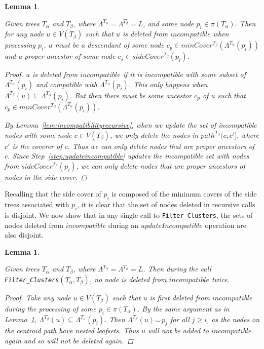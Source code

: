 \documentclass{article}
\newcommand{\compatible}{\smile}
\newcommand{\leafset}{\Lambda}
\newcommand{\TA}{T_\alpha}
\newcommand{\TB}{T_\beta}
\newtheorem{numremovednodesrecursive}[incompatibility]{Lemma}
\newtheorem{numremovednodescentroid}[incompatibility]{Lemma}
\begin{document}
    \begin{numremovednodesrecursive}
        \label{lem:numremovednodesrecursive}

        Given trees $\TA$ and $\TB$, where $\leafset^{\TA} = \leafset^{\TB} = L$, and some node $p_i \in \pi(\TA)$. Then for any node $u \in V(\TB)$ such that $u$ is deleted from $incompatible$ when processing $p_i$, $u$ must be a descendant of some node $c_{p} \in minCover^{\TB}(\leafset^{\TA}(p_i))$ and a proper ancestor of some node $c_s \in sideCover^{\TB}(p_i)$.

        \begin{proof}
            $u$ is deleted from $incompatible$ if it is incompatible with some subset of $\leafset^{\TA}(p_i)$ and compatible with $\leafset^{\TA}(p_i)$. This only happens when $\leafset^{\TB}(u) \subseteq \leafset^{\TA}(p_i)$. But then there must be some ancestor $c_p$ of $u$ such that $c_p \in minCover^{\TB}(\leafset^{\TA}(p_i))$.

            By Lemma~\ref{lem:incompatibilityrecursive}, when we update the set of incompatible nodes with some node $c \in V(\TB)$, we only delete the nodes in $path^{\TB}(c, c']$, where $c'$ is the coverer of $c$. Thus we can only delete nodes that are proper ancestors of $c$. Since Step~\ref{step:updateincompatible} updates the incompatible set with nodes from $sideCover^{\TB}(p_i)$, we can only delete nodes that are proper ancestors of nodes in the side cover.
        \end{proof}
    \end{numremovednodesrecursive}

    Recalling that the side cover of $p_i$ is composed of the minimum covers of the side trees associated with $p_i$, it is clear that the set of nodes deleted in recursive calls is disjoint. We now show that in any single call to \texttt{Filter\_Clusters}, the sets of nodes deleted from $incompatible$ during an $updateIncompatible$ operation are also disjoint.
    \newline

    \begin{numremovednodescentroid}
        \label{lem:numremovednodescentroid}

        Given trees $\TA$ and $\TB$, where $\leafset^{\TA} = \leafset^{\TB} = L$. Then during the call \texttt{Filter\_Clusters}$(\TA, \TB)$, no node is deleted from $incompatible$ twice.

        \begin{proof}
            Take any node $u \in V(\TB)$ such that $u$ is first deleted from $incompatible$ during the processing of some $p_i \in \pi(\TA)$. By the same argument as in Lemma~\ref{lem:numremovednodesrecursive}, $\leafset^{\TB}(u) \subseteq \leafset^{\TA}(p_i)$. Then $\leafset^{\TB}(u) \compatible p_j$ for all $j \geq i$, as the nodes on the centroid path have nested leafsets. Thus $u$ will not be added to $incompatible$ again and so will not be deleted again.
        \end{proof}
    \end{numremovednodescentroid}
\end{document}
